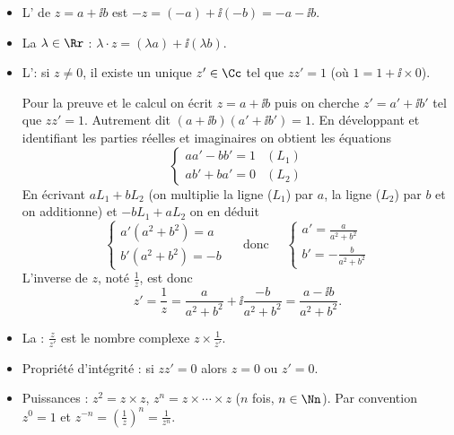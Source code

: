 \documentclass[class=report,crop=false]{standalone}
\begin{document}
\begin{itemize}
  \item L' de $z = a + \ii b$ est $- z = (- a) + \ii (-b) = - a - \ii b$.

  \item La  $\lambda \in \Rr$ : $\lambda \cdot
  z = (\lambda a) + \ii(\lambda b)$.

  \item L': si $z \neq 0$, il existe un unique $z' \in \Cc$ tel
  que $zz' = 1$ (o\`u $1 = 1 + \ii  \times 0$).

Pour la preuve et le calcul on écrit $z=a+\ii b$ puis on cherche $z'=a'+\ii b'$ tel que $zz'=1$.
Autrement dit $(a+ \ii b)(a'+\ii b') =1$. En développant et identifiant les parties
réelles et imaginaires on obtient les \'equations
  \[ \left\{ \begin{array}{ll}
       aa' - bb' = 1 & (L_1)\\
       ab' + ba' = 0 & (L_2)
     \end{array} \right. \]
En écrivant $a L_1 + b L_2$ (on multiplie la ligne ($L_1$) par $a$, la ligne ($L_2$) par $b$ et on additionne)
 et $- bL_1 + aL_2$ on en d\'eduit
  \[ \left\{ \begin{array}{l}
       a'  \left( a^2 + b^2 \right) = a\\
       b'  \left( a^2 + b^2 \right) = - b
     \end{array} \right. \quad \text{ donc }\quad \left\{ \begin{array}{l}
       a' = \frac{a}{a^2 + b^2}\\
       b' = - \frac{b}{a^2 + b^2}
     \end{array} \right. \]
  L'inverse de $z$, noté $\frac1z$, est donc
  \[ z' = \frac{1}{z} = \frac{a}{a^2 + b^2} + \ii  \frac{- b}{a^2 + b^2} =
     \frac{a - \ii b}{a^2 + b^2} . \]

  \item La  : $\frac{z}{z'}$ est le nombre complexe $z \times \frac{1}{z'}$.

  \item Propriété d'intégrité : si $zz' = 0$ alors $z = 0$ ou $z' = 0$.

  \item Puissances : $z^2 = z \times z$, $z^n = z \times \cdots \times z$ ($n$
  fois, $n\in \Nn$). Par convention $z^0 = 1$ et $z^{- n} = \left( \frac{1}{z} \right)^n = \frac{1}{z^n}$.
\end{itemize}
\end{document}
